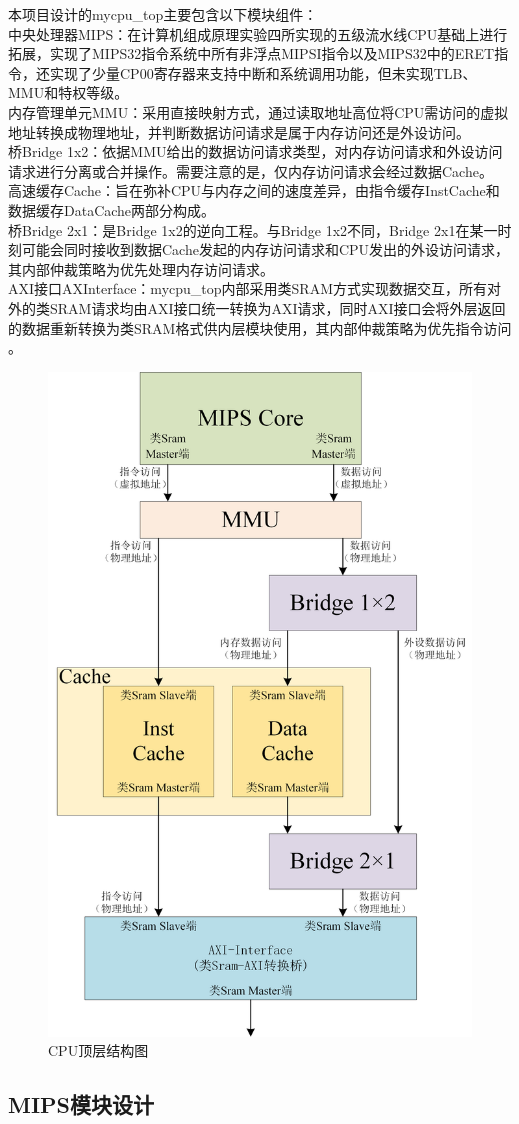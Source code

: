 本项目设计的mycpu\_top主要包含以下模块组件：\\
中央处理器MIPS：在计算机组成原理实验四所实现的五级流水线CPU基础上进行拓展，实现了MIPS32指令系统中所有非浮点MIPSI指令以及MIPS32中的ERET指令，还实现了少量CP00寄存器来支持中断和系统调用功能，但未实现TLB、MMU和特权等级。\\
内存管理单元MMU：采用直接映射方式，通过读取地址高位将CPU需访问的虚拟地址转换成物理地址，并判断数据访问请求是属于内存访问还是外设访问。\\
桥Bridge 1x2：依据MMU给出的数据访问请求类型，对内存访问请求和外设访问请求进行分离或合并操作。需要注意的是，仅内存访问请求会经过数据Cache。\\
高速缓存Cache：旨在弥补CPU与内存之间的速度差异，由指令缓存InstCache和数据缓存DataCache两部分构成。\\
桥Bridge 2x1：是Bridge 1x2的逆向工程。与Bridge 1x2不同，Bridge 2x1在某一时刻可能会同时接收到数据Cache发起的内存访问请求和CPU发出的外设访问请求，其内部仲裁策略为优先处理内存访问请求。\\
AXI接口AXInterface：mycpu\_top内部采用类SRAM方式实现数据交互，所有对外的类SRAM请求均由AXI接口统一转换为AXI请求，同时AXI接口会将外层返回的数据重新转换为类SRAM格式供内层模块使用，其内部仲裁策略为优先指令访问\\。
\begin{figure}
	\centering
	\includegraphics[width=0.5\linewidth]{image/p15.png}
	\caption{CPU顶层结构图}
	\label{fig:enter-label}
\end{figure}
\subsection{MIPS模块设计\textcolor{black}{}}

